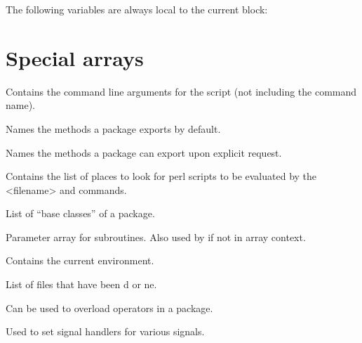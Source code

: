 The following variables are always local to the current block:





\section{Special arrays} 

\begin{enum}{1.5cm}

Contains the command line arguments for the script (not including the command name).

Names the methods a package exports by default.

Names the methods a package can export upon explicit request.

Contains the list of places to look for perl scripts to be evaluated
by the  <filename> and  commands. 

List of ``base classes'' of a package.\ddag

Parameter array for subroutines. Also used by  if not in
array context. 

Contains the current environment.

List of files that have been d or ne.

Can be used to overload operators in a package.

Used to set signal handlers for various signals.

\end{enum}



